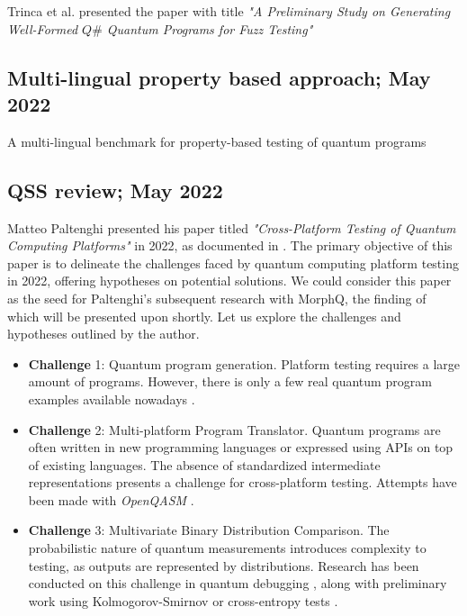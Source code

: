 \begin{itemize}
Trinca et al. presented the paper with title \textit{"A Preliminary Study on Generating Well-Formed
$Q\#$ Quantum Programs for Fuzz Testing"} \cite{trinca2022preliminary}

\vspace{15pt}
\subsection{Multi-lingual property based approach; May 2022}

A multi-lingual benchmark for property-based testing of quantum programs \cite{pontolillo2022multi}

\vspace{15pt}
\subsection{QSS review; May 2022}
Matteo Paltenghi presented his paper titled \textit{"Cross-Platform Testing of Quantum Computing Platforms"} in 2022, as documented in \cite{paltenghi2022cross}. The primary objective of this paper is to delineate the challenges faced by quantum computing platform testing in 2022, offering hypotheses on potential solutions. We could consider this paper as the seed for Paltenghi's subsequent research with MorphQ, the finding of which will be presented upon shortly. Let us explore the challenges and hypotheses outlined by the author.

\vspace{-10pt}
\begin{itemize}
    \item[] \textbf{Challenge} 1: Quantum program generation. Platform testing requires a large amount of programs. However, there is only a few real quantum program examples available nowadays \cite{campos2021qbugs}.
    \item[] \textbf{Challenge} 2: Multi-platform Program Translator. Quantum programs are often written in new programming languages or expressed using APIs on top of existing languages. The absence of standardized intermediate representations presents a challenge for cross-platform testing. Attempts have been made with \textit{OpenQASM} \cite{cross2017open}\cite{cross2022openqasm}.
    \item[] \textbf{Challenge} 3: Multivariate Binary Distribution Comparison. The probabilistic nature of quantum measurements introduces complexity to testing, as outputs are represented by distributions. Research has been conducted on this challenge in quantum debugging \cite{huang2018qdb}\cite{huang2019statistical}\cite{li2020projection} , along with preliminary work using Kolmogorov-Smirnov or cross-entropy tests \cite{wang2021qdiff}.
\end{itemize}


\end{itemize}
